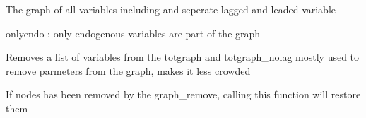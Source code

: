 \documentclass[letterpaper,10pt,english]{sphinxmanual}
\begin{document}
\begin{fulllineitems}

\begin{fulllineitems}
\label{\detokenize{core/modelclass:modelclass.Graph_Mixin.totgraph_get}}
\pysigstartsignatures
{}
\pysigstopsignatures
\sphinxAtStartPar
The graph of all variables including and seperate lagged and leaded variable

\sphinxAtStartPar
onlyendo : only endogenous variables are part of the graph

\end{fulllineitems}


\begin{fulllineitems}
\label{\detokenize{core/modelclass:modelclass.Graph_Mixin.graph_remove}}
\pysigstartsignatures
{}
\pysigstopsignatures
\sphinxAtStartPar
Removes a list of variables from the totgraph and totgraph\_nolag
mostly used to remove parmeters from the graph, makes it less crowded

\end{fulllineitems}


\begin{fulllineitems}
\label{\detokenize{core/modelclass:modelclass.Graph_Mixin.graph_restore}}
\pysigstartsignatures
{}
\pysigstopsignatures
\sphinxAtStartPar
If nodes has been removed by the graph\_remove, calling this function will restore them

\end{fulllineitems}


\end{fulllineitems}

\end{document}
